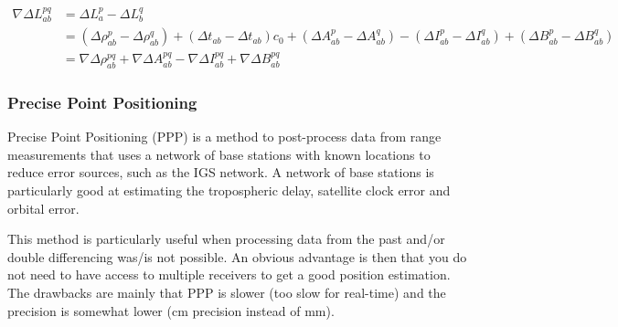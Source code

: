 \documentclass[12pt,a4paper]{article}
\begin{document}
\begin{align}
  \label{eq:double_diff}
  \nabla \Delta L_{ab}^{pq} & = \Delta L_a^p - \Delta L_b^q \nonumber \\
                         & = (\Delta \rho_{ab}^p-\Delta \rho_{ab}^q) + (\Delta t_{ab}-\Delta t_{ab})c_0 + (\Delta A_{ab}^p-\Delta A_{ab}^q) - (\Delta I_{ab}^p-\Delta I_{ab}^q) + (\Delta B_{ab}^p-\Delta B_{ab}^q) \nonumber \\
                         & = \nabla \Delta \rho_{ab}^{pq} + \nabla \Delta A_{ab}^{pq} - \nabla \Delta I_{ab}^{pq} + \nabla \Delta B_{ab}^{pq}
\end{align}

\subsubsection{Precise Point Positioning}
Precise Point Positioning (PPP) is a method to post-process data from range measurements that uses a network of base stations with known locations to reduce error sources, such as the IGS network.
A network of base stations is particularly good at estimating the tropospheric delay, satellite clock error and orbital error.

This method is particularly useful when processing data from the past and/or double differencing was/is not possible.
An obvious advantage is then that you do not need to have access to multiple receivers to get a good position estimation.
The drawbacks are mainly that PPP is slower (too slow for real-time) and the precision is somewhat lower (cm precision instead of mm).
\end{document}

